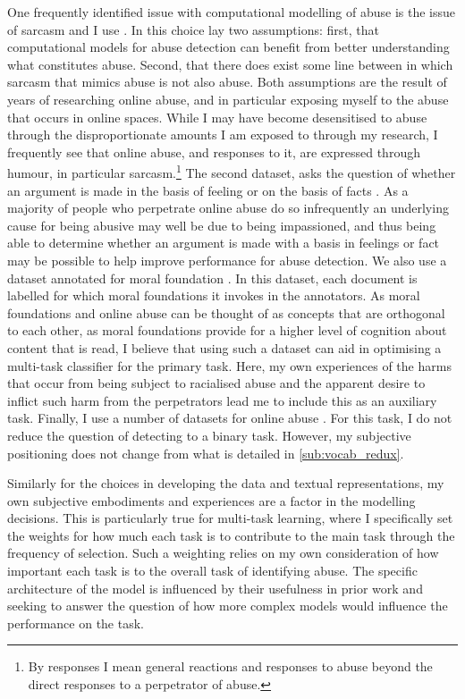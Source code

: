 One frequently identified issue with computational modelling of abuse is the issue of sarcasm \citep{Rottger:2021} and I use \citet{Oraby_sarcasm:2016}. In this choice lay two assumptions: first, that computational models for abuse detection can benefit from better understanding what constitutes abuse. Second, that there does exist some line between in which sarcasm that mimics abuse is not also abuse. Both assumptions are the result of years of researching online abuse, and in particular exposing myself to the abuse that occurs in online spaces. While I may have become desensitised to abuse through the disproportionate amounts I am exposed to through my research, I frequently see that online abuse, and responses to it, are expressed through humour, in particular sarcasm.\footnote{By responses I mean general reactions and responses to abuse beyond the direct responses to a perpetrator of abuse.}
The second dataset, asks the question of whether an argument is made in the basis of feeling or on the basis of facts \citep{Oraby_factfeel:2015}. As a majority of people who perpetrate online abuse do so infrequently \citep{Waseem-Hovy:2016} an underlying cause for being abusive may well be due to being impassioned, and thus being able to determine whether an argument is made with a basis in feelings or fact may be possible to help improve performance for abuse detection.
We also use a dataset annotated for moral foundation \citep{Hoover:2019}. In this dataset, each document is labelled for which moral foundations it invokes in the annotators. As moral foundations and online abuse can be thought of as concepts that are orthogonal to each other, as moral foundations provide for a higher level of cognition about content that is read, I believe that using such a dataset can aid in optimising a multi-task classifier for the primary task. Here, my own experiences of the harms that occur from being subject to racialised abuse and the apparent desire to inflict such harm from the perpetrators lead me to include this as an auxiliary task.
Finally, I use a number of datasets for online abuse \citep{Garcia:2018,Waseem:2016,Waseem-Hovy:2016,Davidson:2017,Wulczyn:2016}. For this task, I do not reduce the question of detecting to a binary task. However, my subjective positioning does not change from what is detailed in \autoref{sub:vocab_redux}.

Similarly for the choices in developing the data and textual representations, my own subjective embodiments and experiences are a factor in the modelling decisions. This is particularly true for multi-task learning, where I specifically set the weights for how much each task is to contribute to the main task through the frequency of selection. Such a weighting relies on my own consideration of how important each task is to the overall task of identifying abuse. The specific architecture of the model is influenced by their usefulness in prior work \citep{Bingel:2018} and seeking to answer the question of how more complex models would influence the performance on the task.

